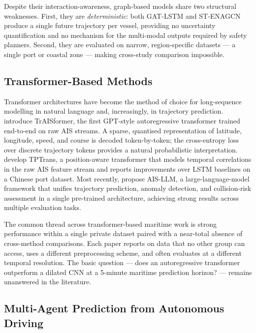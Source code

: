 \documentclass[12pt, a4paper]{article}
\begin{document}
  Despite their interaction-awareness, graph-based models share two structural
  weaknesses.  First, they are \emph{deterministic}: both GAT-LSTM and ST-ENAGCN
  produce a single future trajectory per vessel, providing no uncertainty
  quantification and no mechanism for the multi-modal outputs required by safety
  planners.  Second, they are evaluated on narrow, region-specific datasets — a
  single port or coastal zone — making cross-study comparison impossible.

  \subsection{Transformer-Based Methods}

  Transformer architectures have become the method of choice for long-sequence
  modelling in natural language and, increasingly, in trajectory prediction.
  \citet{nguyen2021traisformer} introduce TrAISformer, the first GPT-style
  autoregressive transformer trained end-to-end on raw AIS streams.  A sparse,
  quantised representation of latitude, longitude, speed, and course is decoded
  token-by-token; the cross-entropy loss over discrete trajectory tokens provides
  a natural probabilistic interpretation.  \citet{wang2024tptrans} develop
  TPTrans, a position-aware transformer that models temporal correlations in the
  raw AIS feature stream and reports improvements over LSTM baselines on a Chinese
  port dataset.  Most recently, \citet{park2025aisllm} propose AIS-LLM, a
  large-language-model framework that unifies trajectory prediction, anomaly
  detection, and collision-risk assessment in a single pre-trained architecture,
  achieving strong results across multiple evaluation tasks.

  The common thread across transformer-based maritime work is strong performance
  within a single private dataset paired with a near-total absence of
  cross-method comparisons.  Each paper reports on data that no other group can
  access, uses a different preprocessing scheme, and often evaluates at a
  different temporal resolution.  The basic question — does an autoregressive
  transformer outperform a dilated CNN at a 5-minute maritime prediction horizon?
  — remains unanswered in the literature.

  \subsection{Multi-Agent Prediction from Autonomous Driving}
\end{document}
